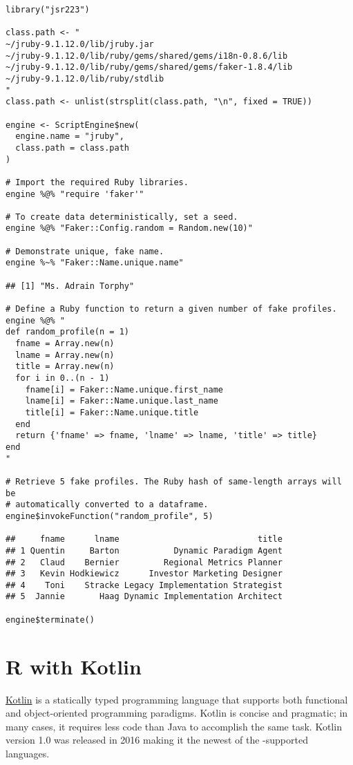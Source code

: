 \begin{verbatim}
library("jsr223")

class.path <- "
~/jruby-9.1.12.0/lib/jruby.jar
~/jruby-9.1.12.0/lib/ruby/gems/shared/gems/i18n-0.8.6/lib
~/jruby-9.1.12.0/lib/ruby/gems/shared/gems/faker-1.8.4/lib
~/jruby-9.1.12.0/lib/ruby/stdlib
"
class.path <- unlist(strsplit(class.path, "\n", fixed = TRUE))

engine <- ScriptEngine$new(
  engine.name = "jruby",
  class.path = class.path
)

# Import the required Ruby libraries.
engine %@% "require 'faker'"

# To create data deterministically, set a seed.
engine %@% "Faker::Config.random = Random.new(10)"

# Demonstrate unique, fake name.
engine %~% "Faker::Name.unique.name"

## [1] "Ms. Adrain Torphy"

# Define a Ruby function to return a given number of fake profiles.
engine %@% "
def random_profile(n = 1)
  fname = Array.new(n)
  lname = Array.new(n)
  title = Array.new(n)
  for i in 0..(n - 1)
    fname[i] = Faker::Name.unique.first_name
    lname[i] = Faker::Name.unique.last_name
    title[i] = Faker::Name.unique.title
  end
  return {'fname' => fname, 'lname' => lname, 'title' => title}
end
"

# Retrieve 5 fake profiles. The Ruby hash of same-length arrays will be
# automatically converted to a dataframe.
engine$invokeFunction("random_profile", 5)

##     fname      lname                            title
## 1 Quentin     Barton           Dynamic Paradigm Agent
## 2   Claud    Bernier         Regional Metrics Planner
## 3   Kevin Hodkiewicz      Investor Marketing Designer
## 4    Toni    Stracke Legacy Implementation Strategist
## 5  Jannie       Haag Dynamic Implementation Architect

engine$terminate()
\end{verbatim}

\section{R with Kotlin}

\href{https://kotlinlang.org/}{Kotlin} is a statically typed programming language that supports both functional and object-oriented programming paradigms. Kotlin is concise and pragmatic; in many cases, it requires less code than Java to accomplish the same task. Kotlin version 1.0 was released in 2016 \citep{kotlin-release} making it the newest of the -supported languages. 

